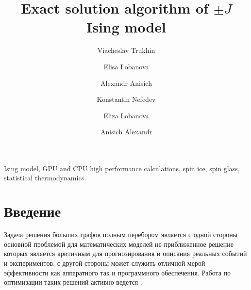 \documentclass[utf8, babel, sor, jor, amsmath, amssymb, reprint]{elsarticle} %
\begin{document}
	
	\begin{frontmatter}
		
		
		\title{Exact solution algorithm of $\pm J$ Ising model}
		
		\author[mainaddress, secondaryaddress]{Viacheslav Trukhin}
		
			\author[mainaddress, secondaryaddress]{Elisa Lobanova}
		
		\author[mainaddress, secondaryaddress]{Alexandr Anisich}
		
		\author[mainaddress, secondaryaddress]{Konstantin Nefedev}
		
		\author[mainaddress, secondaryaddress]{Eliza Lobanova}
		
		\author[mainaddress, secondaryaddress]{Anisich Alexandr}
		
		\address[mainaddress]{Far Eastern Federal University, Vladivostok, Russky Island, 10 Ajax Bay, 690922, the Russian Federation}
		\address[secondaryaddress]{Institute of Applied Mathematics, Far Eastern Branch, Russian Academy of Science, Vladivostok, Radio 7, 690041, the Russian Federation}
		
		\begin{abstract}
			
			
		\end{abstract}
		
		
		\begin{keyword}
			Ising model, GPU and CPU high performance calculations, spin ice, spin glass, statistical thermodynamics.
			
		\end{keyword}
		
		
	\end{frontmatter}
	
	\linenumbers
	\newpage
	\tableofcontents
	
	\newpage
	\section*{Введение}
	
	Задача решения больших графов полным перебором является с одной стороны основной проблемой для математических моделей не приближенное решение которых является критичным для прогнозирования и описания реальных событий и экспериментов, с другой стороны может служить отличной мерой эффективности как аппаратного так и программного обеспечения. Работа по оптимизации таких решений активно ведется \cite{romero2020high}. 
	
\end{document}
